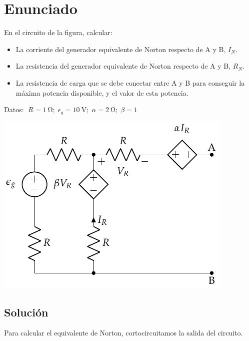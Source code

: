 
\newpage

\section{Enunciado}

En el circuito de la figura, calcular:
\begin{itemize}
\item La corriente del generador equivalente de Norton respecto de A y
  B, $I_N$.
\item La resistencia del generador equivalente de Norton respecto de A
  y B, $R_N$.
\item La resistencia de carga que se debe conectar entre A y B para
  conseguir la máxima potencia disponible, y el valor de esta
  potencia.
\end{itemize}

Datos: $\; R = \qty{1}{\ohm};\; \epsilon_g = \qty{10}{\volt};\; \alpha = \qty{2}{\ohm};\; \beta = 1$

\begin{center}
  
  \vspace{-3mm} 
  \includegraphics{figuras/norton.pdf}
\end{center}

\vspace{-5mm} 
\subsection*{Solución}

Para calcular el equivalente de Norton, cortocircuitamos la salida del circuito. 

